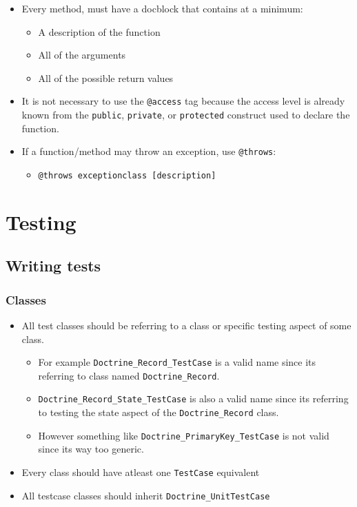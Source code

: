 \documentclass[11pt,a4paper]{report}
\begin{document}
\begin{itemize}
\item{Every method, must have a docblock that contains at a minimum:}
\begin{itemize}
\item{A description of the function}
\item{All of the arguments}
\item{All of the possible return values}
\end{itemize}
\item{It is not necessary to use the \texttt{@access} tag because the access level is already known from the \texttt{public}, \texttt{private}, or \texttt{protected} construct used to declare the function.}
\item{If a function/method may throw an exception, use \texttt{@throws}:}
\begin{itemize}
\item{\texttt{@throws exceptionclass [description]}}
\end{itemize}
\end{itemize}
\section{Testing}
\subsection{Writing tests}
\subsubsection{Classes}
\begin{itemize}
\item{All test classes should be referring to a class or specific testing aspect of some class.}
\begin{itemize}
\item{For example \texttt{Doctrine\_Record\_TestCase} is a valid name since its referring to class named \texttt{Doctrine\_Record}.}
\item{\texttt{Doctrine\_Record\_State\_TestCase} is also a valid name since its referring to testing the state aspect of the \texttt{Doctrine\_Record} class.}
\item{However something like \texttt{Doctrine\_PrimaryKey\_TestCase} is not valid since its way too generic.}
\end{itemize}
\item{Every class should have atleast one \texttt{TestCase} equivalent}
\item{All testcase classes should inherit \texttt{Doctrine\_UnitTestCase}}
\end{itemize}
\end{document}
